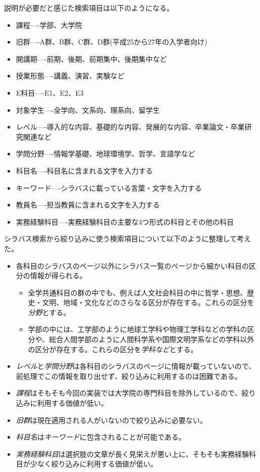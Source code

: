 説明が必要だと感じた検索項目は以下のようになる。\\

\begin{itemize}
  \item 課程----学部、大学院
  \item 旧群----A群、B群、C群、D群(平成25から27年の入学者向け)
  \item 開講期----前期、後期、前期集中、後期集中など
  \item 授業形態----講義、演習、実験など
  \item E科目----E1、E2、E3
  \item 対象学生----全学向、文系向、理系向、留学生
  \item レベル----導入的な内容、基礎的な内容、発展的な内容、卒業論文・卒業研究関連など
  \item 学問分野----情報学基礎、地球環境学、哲学、言語学など
  \item 科目名----科目名に含まれる文字を入力する
  \item キーワード----シラバスに載っている言葉・文字を入力する
  \item 教員名----担当教員に含まれる文字を入力する
  \item 実務経験科目----実務経験科目の主要な4つ形式の科目とその他の科目
\end{itemize}

シラバス検索から絞り込みに使う検索項目について以下のように整理して考えた。\\

\begin{itemize}
  \item 各科目のシラバスのページ以外にシラバス一覧のページから細かい科目の区分の情報が得られる。
  \begin{itemize}
    \item 全学共通科目の群の中でも、例えば人文社会科目の中に哲学・思想、歴史・文明、地域・文化などのさらなる区分が存在する。これらの区分を\emph{分野}とする。
    \item 学部の中には、工学部のように地球工学科や物理工学科などの学科の区分や、総合人間学部のように人間科学系や国際文明学系などの学科以外の区分が存在する。これらの区分を\emph{学科など}とする。
  \end{itemize}
  \item \emph{レベル}と\emph{学問分野}は各科目のシラバスのページに情報が載っていないので、前処理でこの情報を取り出せず、絞り込みに利用するのは困難である。
  \item \emph{課程}はそもそも今回の実装では大学院の専門科目を除外しているので、絞り込みに利用する価値が低い。
  \item \emph{旧群}は現在適用される人がいないので絞り込みに必要ない。
  \item \emph{科目名}は\emph{キーワード}に包含されることが可能である。
  \item \emph{実務経験科目}は選択肢の文章が長く見栄えが悪い上に、そもそも実務経験科目が少なく絞り込みに利用する価値が低い。
\end{itemize}

